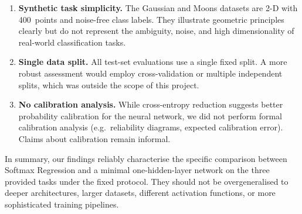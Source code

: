 \documentclass[11pt]{article}
\begin{document}
\begin{enumerate}[leftmargin=2em,itemsep=0.3em]
  \item \textbf{Synthetic task simplicity.}
        The Gaussian and Moons datasets are 2-D with 400~points and noise-free class
        labels.  They illustrate geometric principles clearly but do not represent the
        ambiguity, noise, and high dimensionality of real-world classification tasks.

  \item \textbf{Single data split.}
        All test-set evaluations use a single fixed split.  A more robust assessment would
        employ cross-validation or multiple independent splits, which was outside the scope
        of this project.

  \item \textbf{No calibration analysis.}
        While cross-entropy reduction suggests better probability calibration for the neural
        network, we did not perform formal calibration analysis (e.g.\ reliability diagrams,
        expected calibration error).  Claims about calibration remain informal.
\end{enumerate}

In summary, our findings reliably characterise the specific comparison between Softmax
Regression and a minimal one-hidden-layer network on the three provided tasks under the
fixed protocol.  They should not be overgeneralised to deeper architectures, larger
datasets, different activation functions, or more sophisticated training pipelines.

\newpage
\end{document}
